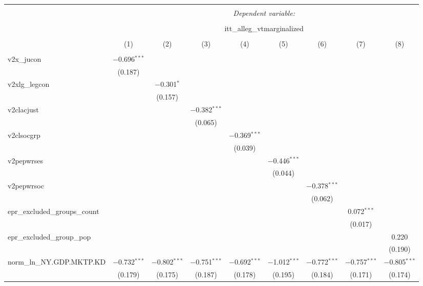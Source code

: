 
\begin{sidewaystable}[!htbp] \centering 
  \caption{} 
  \label{} 
\tiny 
\begin{tabular}{@{\extracolsep{5pt}}lcccccccc} 
\\[-1.8ex]\hline 
\hline \\[-1.8ex] 
 & \multicolumn{8}{c}{\textit{Dependent variable:}} \\ 
\cline{2-9} 
\\[-1.8ex] & \multicolumn{8}{c}{itt\_alleg\_vtmarginalized} \\ 
\\[-1.8ex] & (1) & (2) & (3) & (4) & (5) & (6) & (7) & (8)\\ 
\hline \\[-1.8ex] 
 v2x\_jucon & $-$0.696$^{***}$ &  &  &  &  &  &  &  \\ 
  & (0.187) &  &  &  &  &  &  &  \\ 
  v2xlg\_legcon &  & $-$0.301$^{*}$ &  &  &  &  &  &  \\ 
  &  & (0.157) &  &  &  &  &  &  \\ 
  v2clacjust &  &  & $-$0.382$^{***}$ &  &  &  &  &  \\ 
  &  &  & (0.065) &  &  &  &  &  \\ 
  v2clsocgrp &  &  &  & $-$0.369$^{***}$ &  &  &  &  \\ 
  &  &  &  & (0.039) &  &  &  &  \\ 
  v2pepwrses &  &  &  &  & $-$0.446$^{***}$ &  &  &  \\ 
  &  &  &  &  & (0.044) &  &  &  \\ 
  v2pepwrsoc &  &  &  &  &  & $-$0.378$^{***}$ &  &  \\ 
  &  &  &  &  &  & (0.062) &  &  \\ 
  epr\_excluded\_groups\_count &  &  &  &  &  &  & 0.072$^{***}$ &  \\ 
  &  &  &  &  &  &  & (0.017) &  \\ 
  epr\_excluded\_group\_pop &  &  &  &  &  &  &  & 0.220 \\ 
  &  &  &  &  &  &  &  & (0.190) \\ 
  norm\_ln\_NY.GDP.MKTP.KD & $-$0.732$^{***}$ & $-$0.802$^{***}$ & $-$0.751$^{***}$ & $-$0.692$^{***}$ & $-$1.012$^{***}$ & $-$0.772$^{***}$ & $-$0.757$^{***}$ & $-$0.805$^{***}$ \\ 
  & (0.179) & (0.175) & (0.187) & (0.178) & (0.195) & (0.184) & (0.171) & (0.174) \\ 

\end{tabular}
\end{sidewaystable}
